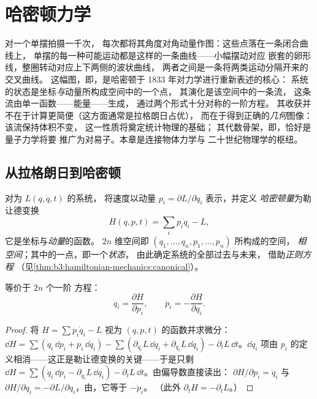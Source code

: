 \chapter{哈密顿力学}\label{ch:b3:hamiltonian-mechanics}

对一个单摆拍摄一千次，
每次都将其角度对角动量作图：这些点落在一条闭合曲线上，
单摆的每一种可能运动都是这样的一条曲线——小幅摆动对应
嵌套的卵形线，整圈转动对应上下两侧的波状曲线，
两者之间是一条将两类运动分隔开来的交叉曲线。
这幅图，即\emph{}，是哈密顿于 1833 年对力学进行重新表述的核心：
系统的状态是坐标\emph{与}动量所构成空间中的一个点，
其演化是该空间中的一条流，
这条流由单一函数——能量——生成，
通过两个形式十分对称的一阶方程。
其收获并不在于计算更简便（这方面通常是拉格朗日占优），
而在于得到正确的\emph{几何}图像：该流保持体积不变，
这一性质将奠定统计物理的基础；
其代数骨架，即，恰好是量子力学将要
推广为对易子。本章是连接物体力学与
二十世纪物理学的枢纽。

\section{从拉格朗日到哈密顿}

\begin{definition}[哈密顿量与正则方程]\label{def:b3:hamiltonian-mechanics:hamiltonian}
对为 $L(q, \dot q, t)$ 的系统，
将速度以动量 $p_i = \partial L/\partial\dot q_i$ 表示，并定义
\emph{哈密顿量}为勒让德变换
\[
H(q, p, t) = \sum_i p_i\dot q_i - L ,
\]
它是坐标与\emph{动量}的函数。
$2n$ 维空间即 $(q_1, \dots, q_n, p_1, \dots, p_n)$ 所构成的空间，
\emph{相空间}；其中的一点，即一个\emph{状态}，
由此确定系统的全部过去与未来，
借助\emph{正则方程}
（见\cref{thm:b3:hamiltonian-mechanics:canonical}）。
\end{definition}

\begin{theorem}[正则方程]\label{thm:b3:hamiltonian-mechanics:canonical}
等价于 $2n$ 个一阶
方程：
\[
\dot q_i = \frac{\partial H}{\partial p_i} , \qquad
\dot p_i = -\frac{\partial H}{\partial q_i} .
\]
\end{theorem}

\begin{proof}
将 $H = \sum p_i\dot q_i - L$ 视为 $(q, p, t)$ 的函数并求微分：
$\dd H = \sum(\dot q_i\,\dd p_i + p_i\,\dd\dot q_i) - \sum(
\partial_{q_i}L\,\dd q_i + \partial_{\dot q_i}L\,\dd\dot q_i) -
\partial_tL\,\dd t$。$\dd\dot q_i$ 项由
$p_i$ 的定义相消——这正是勒让德变换的关键——于是只剩
$\dd H = \sum(\dot q_i\,\dd p_i - \partial_{q_i}L\,\dd q_i) -
\partial_tL\,\dd t$。由偏导数直接读出：
$\partial H/\partial p_i = \dot q_i$ 与 $\partial H/\partial q_i =
-\partial L/\partial q_i$，由，它等于 $-\dot p_i$。
（此外 $\partial_tH = -\partial_tL$。）
\end{proof}

